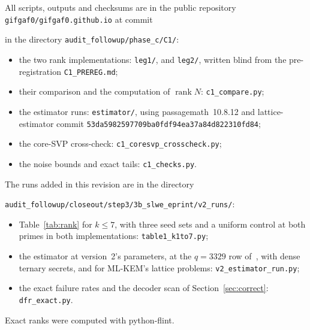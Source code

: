 \documentclass[11pt]{article}
\theoremstyle{remark}
\DeclareMathOperator{\rank}{rank}
\begin{document}
All scripts, outputs and checksums are in the public repository \texttt{gifgaf0/gifgaf0.github.io} at commit
\par\nopagebreak{}\smallskip
\noindent in the directory \texttt{audit\_followup/phase\_c/C1/}:
\begin{itemize}
\item the two rank implementations: \texttt{leg1/}, and \texttt{leg2/}, written blind from the pre-registration
  \texttt{C1\_PREREG.md};
\item their comparison and the computation of $\rank N$: \texttt{c1\_compare.py};
\item the estimator runs: \texttt{estimator/}, using passagemath~10.8.12 and lattice-estimator commit
  \texttt{53da5982597709ba0fdf94ea37a84d822310fd84};
\item the core-SVP cross-check: \texttt{c1\_coresvp\_crosscheck.py};
\item the noise bounds and exact tails: \texttt{c1\_checks.py}.
\end{itemize}
The runs added in this revision are in the directory\par\nopagebreak\smallskip
{\centering\texttt{audit\_followup/closeout/step3/3b\_slwe\_eprint/v2\_runs/}:\par}\smallskip
\begin{itemize}
\item Table~\ref{tab:rank} for $k\le7$, with three seed sets and a uniform control at both primes in both
  implementations: \texttt{table1\_k1to7.py};
\item the estimator at version~2's parameters, at the $q=3329$ row of~\cite{Gif26b}, with dense ternary secrets, and for
  ML-KEM's lattice problems: \texttt{v2\_estimator\_run.py};
\item the exact failure rates and the decoder scan of Section~\ref{sec:correct}: \texttt{dfr\_exact.py}.
\end{itemize}
Exact ranks were computed with python-flint.
\end{document}
